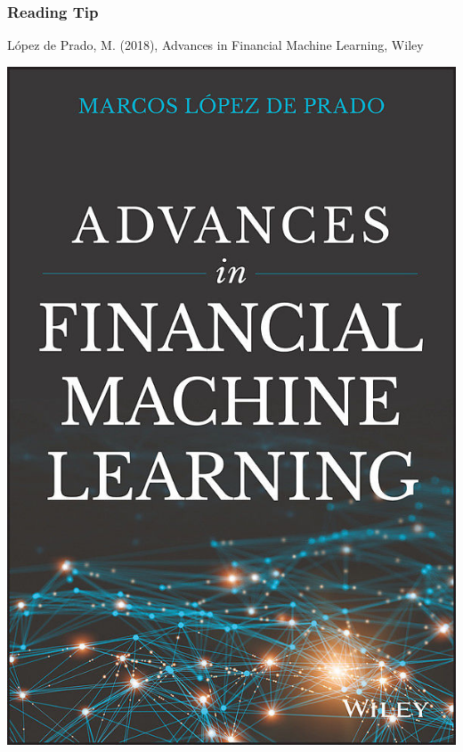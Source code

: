 \documentclass[xcolor=dvipsnames, english, 8pt]{beamer}
\begin{document}
        \begin{frame}
            \frametitle{Reading Tip}
        López de Prado, M. (2018), Advances in Financial Machine Learning, Wiley\vspace{0.35cm}\\
        \begin{center}

            \includegraphics[scale=0.85]{DePrado}
        \end{center}
        \end{frame}
\end{document}
